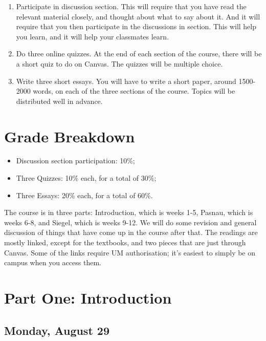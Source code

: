 \documentclass[
]{article}
\providecommand{\tightlist}{%
  \setlength{\itemsep}{0pt}\setlength{\parskip}{0pt}}\usepackage{longtable,booktabs,array}
\begin{document}
\begin{enumerate}
\def\labelenumi{\arabic{enumi}.}
\item
  Participate in discussion section. This will require that you have
  read the relevant material closely, and thought about what to say
  about it. And it will require that you then participate in the
  discussions in section. This will help you learn, and it will help
  your classmates learn.
\item
  Do three online quizzes. At the end of each section of the course,
  there will be a short quiz to do on Canvas. The quizzes will be
  multiple choice.
\item
  Write three short essays. You will have to write a short paper, around
  1500-2000 words, on each of the three sections of the course. Topics
  will be distributed well in advance.
\end{enumerate}

\hypertarget{grade-breakdown}{%
\section{Grade Breakdown}\label{grade-breakdown}}

\begin{itemize}
\tightlist
\item
  Discussion section participation: 10\%;
\item
  Three Quizzes: 10\% each, for a total of 30\%;
\item
  Three Essays: 20\% each, for a total of 60\%.
\end{itemize}

\newpage

The course is in three parts: Introduction, which is weeks 1-5, Pasnau,
which is weeks 6-8, and Siegel, which is weeks 9-12. We will do some
revision and general discussion of things that have come up in the
course after that. The readings are mostly linked, except for the
textbooks, and two pieces that are just through Canvas. Some of the
links require UM authorisation; it's easiest to simply be on campus when
you access them.

\hypertarget{part-one-introduction}{%
\section{Part One: Introduction}\label{part-one-introduction}}

\hypertarget{monday-august-29}{%
\subsection{Monday, August 29}\label{monday-august-29}}
\end{document}
